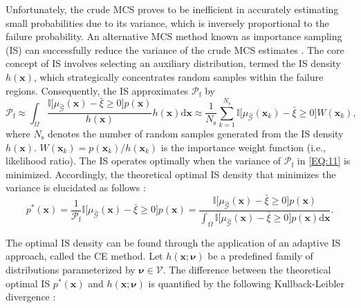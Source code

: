 \documentclass[preprint,3p]{elsarticle}
\begin{document}
\begin{linenumbers}
Unfortunately, the crude MCS proves to be inefficient in accurately estimating small probabilities due to its variance, which is inversely proportional to the failure probability.
An alternative MCS method known as importance sampling (IS) can successfully reduce the variance of the crude MCS estimates \cite{AU1999}. The core concept of IS involves selecting an auxiliary distribution, termed the IS density $h(\textbf{x})$, which strategically concentrates random samples within the failure regions. Consequently, the IS approximates $\mathcal{P}_{\text{f}}$ by
\begin{equation}
    \mathcal{P}_\text{f} \approx \int_\Omega \frac{\mathbb{I}\bigr[\mu_{\widehat{\mathcal{G}}}(\textbf{x}) - \bar\xi \geq 0 \bigl]p(\textbf{x})}{h(\textbf{x})}h(\textbf{x})\mathrm{d}\textbf{x} \approx \frac{1}{N_\text{s}}\displaystyle\sum_{k=1}^{N_\text{s}} \mathbb{I}\bigr[\mu_{\widehat{\mathcal{G}}}(\textbf{x}_k) - \bar\xi\geq 0 \bigl] {W}\left(\textbf{x}_k\right),
\label{EQ:11}
\end{equation}
where $N_\text{s}$ denotes the number of random samples generated from the IS density $h(\textbf{x})$. ${W}\left(\textbf{x}_k\right) = p\left(\textbf{x}_k\right)/h\left(\textbf{x}_k\right)$ is the importance weight function (i.e., likelihood ratio).
The IS operates optimally when the variance of $\mathcal{P}_\text{f}$ in \cref{EQ:11} is minimized.
Accordingly, the theoretical optimal IS density that minimizes the variance is elucidated as follows \cite{AU1999}:
\begin{equation}
    p^{*}(\textbf{x}) = \frac{1}{\mathcal{P}_\text{f}}{\mathbb{I}\bigr[\mu_{\widehat{\mathcal{G}}}(\textbf{x}) - \bar\xi \geq 0 \bigl]p(\textbf{x})} = \frac{\mathbb{I}\bigr[\mu_{\widehat{\mathcal{G}}}(\textbf{x}) - \bar\xi \geq 0 \bigl]p(\textbf{x})}{ \int_\Omega {\mathbb{I}\bigr[\mu_{\widehat{\mathcal{G}}}(\textbf{x}) - \bar\xi \geq 0 \bigl]p(\textbf{x})}\mathrm{d}\textbf{x}}.
\label{EQ:12}
\end{equation}

The optimal IS density can be found through the application of an adaptive IS approach, called the CE method. Let ${h}\left(\textbf{x};\boldsymbol{\nu}\right)$ be a predefined family of distributions parameterized by $\boldsymbol{\nu} \in \mathcal{V}$. The difference between the theoretical optimal IS $p^{*}(\textbf{x})$ and $h\left(\textbf{x};\boldsymbol{\nu}\right)$ is quantified by the following Kullback-Leibler divergence \cite{GEYER2019}:


\end{linenumbers}
\end{document}
